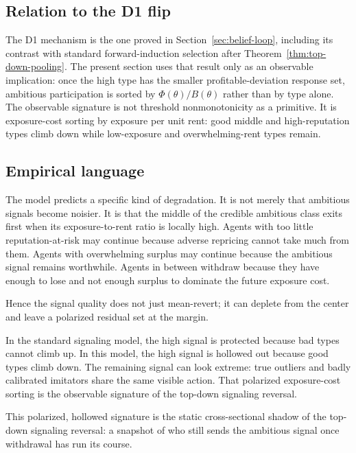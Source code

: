 
\InsertPolarizationVarianceFigure

\subsection{Relation to the D1 flip}

The D1 mechanism is the one proved in Section~\ref{sec:belief-loop}, including its contrast with standard forward-induction selection after Theorem~\ref{thm:top-down-pooling}. The present section uses that result only as an observable implication: once the high type has the smaller profitable-deviation response set, ambitious participation is sorted by \(\Phi(\theta)/B(\theta)\) rather than by type alone. The observable signature is not threshold nonmonotonicity as a primitive. It is exposure-cost sorting by exposure per unit rent: good middle and high-reputation types climb down while low-exposure and overwhelming-rent types remain.

\subsection{Empirical language}

The model predicts a specific kind of degradation. It is not merely that ambitious signals become noisier. It is that the middle of the credible ambitious class exits first when its exposure-to-rent ratio is locally high. Agents with too little reputation-at-risk may continue because adverse repricing cannot take much from them. Agents with overwhelming surplus may continue because the ambitious signal remains worthwhile. Agents in between withdraw because they have enough to lose and not enough surplus to dominate the future exposure cost.

Hence the signal quality does not just mean-revert; it can deplete from the center and leave a polarized residual set at the margin.

In the standard signaling model, the high signal is protected because bad types cannot climb up. In this model, the high signal is hollowed out because good types climb down. The remaining signal can look extreme: true outliers and badly calibrated imitators share the same visible action. That polarized exposure-cost sorting is the observable signature of the top-down signaling reversal.

This polarized, hollowed signature is the static cross-sectional shadow of the top-down signaling reversal: a snapshot of who still sends the ambitious signal once withdrawal has run its course.

